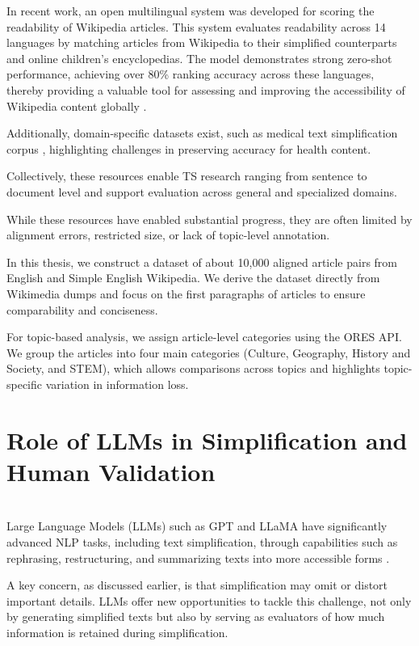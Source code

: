 \documentclass{DESSThesis}
\begin{document}
In recent work, an open multilingual system was developed for scoring the readability of Wikipedia articles. This system evaluates readability across 14 languages by matching articles from Wikipedia to their simplified counterparts and online children's encyclopedias. The model demonstrates strong zero-shot performance, achieving over 80\% ranking accuracy across these languages, thereby providing a valuable tool for assessing and improving the accessibility of Wikipedia content globally \cite{trokhymovych2024openmultilingualscoringreadability}.  

Additionally, domain-specific datasets exist, such as medical text simplification corpus \cite{10.1145/3308558.3313630}, highlighting challenges in preserving accuracy for health content\cite{kandula2010semantic,basu2021automatic}. 

Collectively, these resources enable TS research ranging from sentence to document level and support evaluation across general and specialized domains.  

While these resources have enabled substantial progress, they are often limited by alignment errors, restricted size, or lack of topic-level annotation. 

In this thesis, we construct a dataset of about 10,000 aligned article pairs from English and Simple English Wikipedia. We derive the dataset directly from Wikimedia dumps and focus on the first paragraphs of articles to ensure comparability and conciseness.

For topic-based analysis, we assign article-level categories using the ORES API. We group the articles into four main categories (Culture, Geography, History and Society, and STEM), which allows comparisons across topics and highlights topic-specific variation in information loss.

\section{Role of LLMs in Simplification and Human Validation}\\

Large Language Models (LLMs) such as GPT and LLaMA have significantly advanced NLP tasks, including text simplification, through capabilities such as rephrasing, restructuring, and summarizing texts into more accessible forms \cite{kew2023bless,baez-saggion-2023-lsllama,  martínez2024exploringlargelanguagemodels,fang2025progressivedocumentleveltextsimplification}. 

A key concern, as discussed earlier, is that simplification may omit or distort important details\cite{trienes2024infolossqacharacterizingrecoveringinformation}. LLMs offer new opportunities to tackle this challenge, not only by generating simplified texts but also by serving as evaluators of how much information is retained during simplification\cite{chen2023evaluating, liu2025evaluation}.
\end{document}
